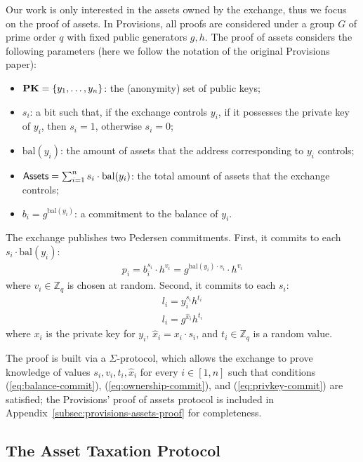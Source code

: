 Our work is only interested in the assets owned by the exchange, thus we focus
on the proof of assets. In Provisions, all proofs are considered under a group
$G$ of prime order $q$ with fixed public generators $g, h$. The proof of assets
considers the following parameters (here we follow the notation of the original
Provisions paper):
\begin{itemize}
    \item $\text{\textbf{PK}} = \{y_1, \dots, y_n \}$: the (anonymity) set of public keys;
    \item $s_i$: a bit such that, if the exchange controls $y_i$, \ie if it possesses the private key of $y_i$, then $s_i = 1$, otherwise $s_i = 0$;
    \item $\text{bal}(y_i)$: the amount of assets that the address corresponding to $y_i$ controls;
    \item $\mathsf{Assets} = \sum_{i = 1}^n s_i \cdot \text{bal}(y_i)$: the total amount of assets that the exchange controls;
    \item $b_i = g^{\text{bal}(y_i)}$: a commitment to the balance of $y_i$.
\end{itemize}

The exchange publishes two Pedersen commitments. First, it commits to each $s_i
\cdot \text{bal}(y_i)$:
\begin{align}
    p_i = b_i^{s_i} \cdot h^{v_i} = g^{\text{bal}(y_i) \cdot s_i} \cdot h^{v_i} \label{eq:balance-commit}
\end{align}
where $v_i \in \mathbb{Z}_q$ is chosen at random.
Second, it commits to each $s_i$:
\begin{align}
    l_i = y_i^{s_i}h^{t_i} \label{eq:ownership-commit} \\
    l_i = g^{\hat{x}_i}h^{t_i} \label{eq:privkey-commit}
\end{align}
where $x_i$ is the private key for $y_i$, $\hat{x}_i = x_i \cdot s_i$, and $t_i
\in \mathbb{Z}_q$ is a random value.

The proof is built via a $\Sigma$-protocol, which allows the exchange to prove
knowledge of values $s_i, v_i, t_i, \hat{x}_i$ for every $i \in [1, n]$ such
that conditions (\ref{eq:balance-commit}), (\ref{eq:ownership-commit}), and
(\ref{eq:privkey-commit}) are satisfied; the Provisions' proof of assets
protocol is included in Appendix~\ref{subsec:provisions-assets-proof} for
completeness.

\subsection{The Asset Taxation Protocol}\label{subsec:tax-authority-proto}


